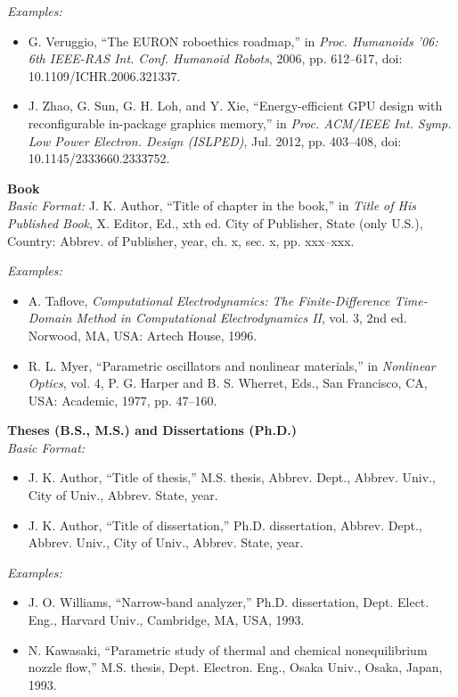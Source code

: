 \documentclass[10pt,a4paper]{article}
\begin{document}
\textit{Examples:}
\begin{itemize}
    \setlength{\itemsep}{0pt}
    \setlength{\parskip}{0pt}
    \item G. Veruggio, ``The EURON roboethics roadmap,'' in \textit{Proc. Humanoids '06: 6th IEEE-RAS Int. Conf. Humanoid Robots}, 2006, pp. 612--617, doi: 10.1109/ICHR.2006.321337.
    \item J. Zhao, G. Sun, G. H. Loh, and Y. Xie, ``Energy-efficient GPU design with reconfigurable in-package graphics memory,'' in \textit{Proc. ACM/IEEE Int. Symp. Low Power Electron. Design (ISLPED)}, Jul. 2012, pp. 403--408, doi: 10.1145/2333660.2333752.
\end{itemize}

\textbf{Book}\\
\textit{Basic Format:}
J. K. Author, ``Title of chapter in the book,'' in \textit{Title of His Published Book}, X. Editor, Ed., xth ed. City of Publisher, State (only U.S.), Country: Abbrev. of Publisher, year, ch. x, sec. x, pp. xxx--xxx.

\textit{Examples:}
\begin{itemize}
    \setlength{\itemsep}{0pt}
    \setlength{\parskip}{0pt}
    \item A. Taflove, \textit{Computational Electrodynamics: The Finite-Difference Time-Domain Method in Computational Electrodynamics II}, vol. 3, 2nd ed. Norwood, MA, USA: Artech House, 1996.
    \item R. L. Myer, ``Parametric oscillators and nonlinear materials,'' in \textit{Nonlinear Optics}, vol. 4, P. G. Harper and B. S. Wherret, Eds., San Francisco, CA, USA: Academic, 1977, pp. 47--160.
\end{itemize}

\textbf{Theses (B.S., M.S.) and Dissertations (Ph.D.)}\\
\textit{Basic Format:}
\begin{itemize}
    \setlength{\itemsep}{0pt}
    \setlength{\parskip}{0pt}
    \item J. K. Author, ``Title of thesis,'' M.S. thesis, Abbrev. Dept., Abbrev. Univ., City of Univ., Abbrev. State, year.
    \item J. K. Author, ``Title of dissertation,'' Ph.D. dissertation, Abbrev. Dept., Abbrev. Univ., City of Univ., Abbrev. State, year.
\end{itemize}

\textit{Examples:}
\begin{itemize}
    \setlength{\itemsep}{0pt}
    \setlength{\parskip}{0pt}
    \item J. O. Williams, ``Narrow-band analyzer,'' Ph.D. dissertation, Dept. Elect. Eng., Harvard Univ., Cambridge, MA, USA, 1993.
    \item N. Kawasaki, ``Parametric study of thermal and chemical nonequilibrium nozzle flow,'' M.S. thesis, Dept. Electron. Eng., Osaka Univ., Osaka, Japan, 1993.
\end{itemize}
\end{document}
